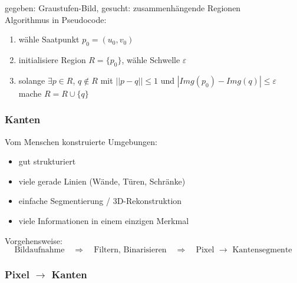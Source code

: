 gegeben: Graustufen-Bild, gesucht: zusammenhängende Regionen \\ Algorithmus in Pseudocode:
\begin{enumerate}
\item wähle Saatpunkt $p_0 = (u_0,v_0)$
\item initialisiere Region $R = \{ p_0 \}$, wähle Schwelle $\varepsilon$
\item solange $\exists p \in R$, $q \not\in R$ mit $||p-q|| \leq 1$ und $|Img(p_0) - Img(q)| \leq \varepsilon$ mache $R = R \cup \{ q \}$
\end{enumerate}

\subsubsection*{Kanten}

Vom Menschen konstruierte Umgebungen:
\begin{itemize}
\item gut strukturiert
\item viele gerade Linien (Wände, Türen, Schränke)
\item einfache Segmentierung / 3D-Rekonstruktion
\item viele Informationen in einem einzigen Merkmal
\end{itemize}
Vorgehensweise: $$\textrm{Bildaufnahme} \quad \Rightarrow \quad \textrm{Filtern, Binarisieren} \quad \Rightarrow \quad \textrm{Pixel } \to \textrm{ Kantensegmente}$$

\subsubsection*{Pixel $\to$ Kanten}

